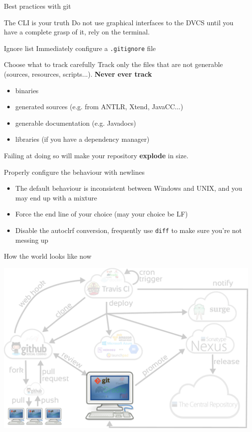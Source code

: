 \documentclass[presentation]{beamer}
\begin{document}
\begin{frame}{Best practices with git}
	\begin{block}{The CLI is your truth}
		Do not use graphical interfaces to the DVCS until you have a complete grasp of it, rely on the terminal.
	\end{block}
	\begin{block}{Ignore list}
		Immediately configure a \texttt{.gitignore} file
	\end{block}
	\begin{block}{Choose what to track carefully}
		Track only the files that are not generable (sources, resources, scripts...). \textbf{Never ever track}
		\begin{itemize}
			\item binaries
			\item generated sources (e.g. from ANTLR, Xtend, JavaCC...)
			\item generable documentation (e.g. Javadocs)
			\item libraries (if you have a dependency manager)
		\end{itemize}
		Failing at doing so will make your repository \textbf{explode} in size.
	\end{block}
	\begin{block}{Properly configure the behaviour with newlines}
		\begin{itemize}
			\item The default behaviour is inconsistent between Windows and UNIX, and you may end up with a mixture
			\item Force the end line of your choice (may your choice be LF)
			\item Disable the autoclrf conversion, frequently use \texttt{diff} to make sure you're not messing up
		\end{itemize}
	\end{block}
\end{frame}

\begin{frame}[fragile]{How the world looks like now}
	\begin{center}
		\includegraphics[width=.9\textwidth]{images/ci-git}
	\end{center}
\end{frame}
\end{document}
